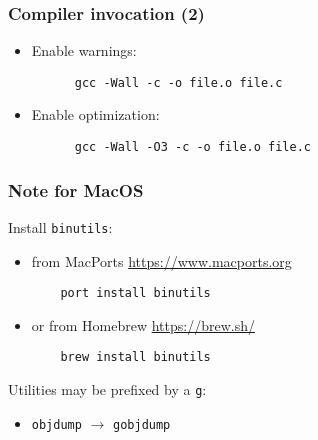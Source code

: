 \documentclass[12pt]{article}
\begin{document}
\subsubsection{Compiler invocation (2)}

\begin{itemize}
  \item Enable warnings:
    \begin{lstlisting}
      gcc -Wall -c -o file.o file.c
    \end{lstlisting}
  \item Enable optimization:
    \begin{lstlisting}
      gcc -Wall -O3 -c -o file.o file.c
    \end{lstlisting}
\end{itemize}

\subsubsection{Note for MacOS}
Install \texttt{binutils}:
\begin{itemize}
    \item from MacPorts \url{https://www.macports.org}
    \begin{lstlisting}
    port install binutils
    \end{lstlisting}
    \item or from Homebrew \url{https://brew.sh/}
    \begin{lstlisting}
    brew install binutils
    \end{lstlisting}
\end{itemize}
Utilities may be prefixed by a \texttt{g}:
\begin{itemize}
    \item \texttt{objdump} $\rightarrow$ \texttt{gobjdump}
\end{itemize}
\end{document}
